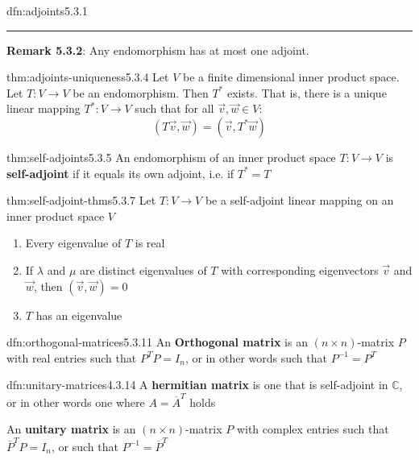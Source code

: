 \documentclass[landscape, 8pt]{extarticle}
\begin{document}
\begin{multicols}{3}
\begin{dfn}[Adjoints]{dfn:adjoints}{5.3.1}
    \noindent\rule{\textwidth}{0.2pt}
    \textbf{Remark 5.3.2}: Any endomorphism has at most one adjoint.
\end{dfn}

\begin{thm}[]{thm:adjoints-uniqueness}{5.3.4}
    Let $V$ be a finite dimensional inner product space. Let $T : V \to V$ be an endomorphism. Then $T^{*}$ exists. That is, there is a unique linear mapping $T^{*} : V \to V$ such that for all $\vec{v}, \vec{w}\in V$:
    \[(T \vec{v}, \vec{w}) = (\vec{v}, T^{*}\vec{w})\]
\end{thm}

\begin{dfn}{thm:self-adjoints}{5.3.5}
    An endomorphism of an inner product space $T : V \to V$ is \textbf{self-adjoint} if it equals its own adjoint, i.e. if $T^{*} = T$
\end{dfn}

\begin{thm}{thm:self-adjoint-thms}{5.3.7}
    Let $T : V\to V$ be a self-adjoint linear mapping on an inner product space $V$
    \begin{enumerate}
        \setlength\itemsep{0em}
        \item Every eigenvalue of $T$ is real
        \item If $\lambda$ and $\mu$ are distinct eigenvalues of $T$ with corresponding eigenvectors $\vec{v}$ and $\vec{w}$, then $(\vec{v}, \vec{w}) = 0$
        \item $T$ has an eigenvalue
    \end{enumerate}
\end{thm}

\begin{dfn}{dfn:orthogonal-matrices}{5.3.11}
    An \textbf{Orthogonal matrix} is an $(n \times n)$-matrix $P$ with real entries such that $P^{T}P = I_{n}$, or in other words such that $P^{-1} = P^{T}$
\end{dfn}

\begin{dfn}{dfn:unitary-matrices}{4.3.14}
    A \textbf{hermitian matrix} is one that is self-adjoint in $\mathbb{C}$, or in other words one where $A = \overline{A}^{T}$ holds


    An \textbf{unitary matrix} is an $(n \times n)$-matrix $P$ with complex entries such that $\overline{P}^{T}P = I_{n}$, or such that $P^{-1} = \overline{P}^{T}$
\end{dfn}


\end{multicols}
\end{document}
